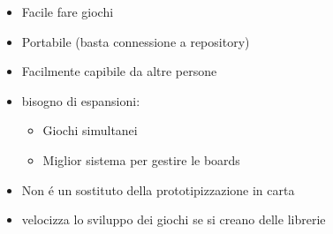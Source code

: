 \begin{itemize}
    \item Facile fare giochi
    \item Portabile (basta connessione a repository)
    \item Facilmente capibile da altre persone 
    \item {
        bisogno di espansioni:
        \begin{itemize}
            \item Giochi simultanei
            \item Miglior sistema per gestire le boards 
        \end{itemize}
    }
    \item Non é un sostituto della prototipizzazione in carta
    \item velocizza lo sviluppo dei giochi se si creano delle librerie 
\end{itemize}